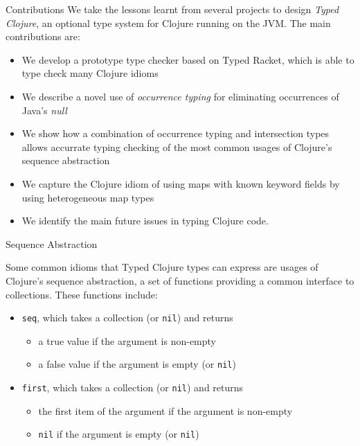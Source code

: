 \documentclass[landscape,final,a0paper,fontscale=0.25]{baposter}
\begin{document}
\begin{poster}
\begin{posterbox}[name=contribution,column=0,below=problem]{Contributions}
We take the lessons learnt from several projects to design \emph{Typed Clojure},
an optional type system for Clojure running on the JVM. 
The main contributions are:
\begin{itemize}
  \item We develop a prototype type checker based on Typed Racket, which is able to type check many Clojure idioms
  \item We describe a novel use of \emph{occurrence typing} for eliminating occurrences of Java's \emph{null}
  \item We show how a combination of occurrence typing and intersection types allows accurrate typing checking of
        the most common usages of Clojure's sequence abstraction 
  \item We capture the Clojure idiom of using maps with known keyword fields by using heterogeneous map types
  \item We identify the main future issues in typing Clojure code.

\end{itemize}

\end{posterbox}

\begin{posterbox}[name=sequenceabs,column=1]{Sequence Abstraction}

Some common idioms that Typed Clojure types can express
are usages of Clojure's sequence abstraction, a set of functions providing a common
interface to collections.
These functions include:

\begin{itemize}
\item \lstinline|seq|, which takes a collection (or \lstinline|nil|) and returns
   \begin{itemize}
      \item a true value if the argument is non-empty
      \item a false value if the argument is empty (or \lstinline|nil|)
   \end{itemize}
\item \lstinline|first|, which takes a collection (or \lstinline|nil|) and returns
   \begin{itemize}
      \item the first item of the argument if the argument is non-empty
      \item \lstinline|nil| if the argument is empty (or \lstinline|nil|)
    \end{itemize}
\end{itemize}


\end{posterbox}
\end{poster}
\end{document}
